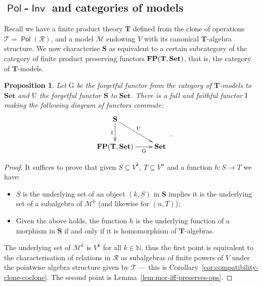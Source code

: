 \documentclass[11pt, a4paper, twoside,leqno]{amsart}
\newcommand{\cat}[1]{\mathbf{#1}}
\newcommand{\cd}[2][]{\vcenter{\hbox{\xymatrix#1{#2}}}}
\numberwithin{equation}{section}
\theoremstyle{plain}
\newtheorem{Prop}[Thm]{Proposition}
\theoremstyle{definition}
\newcommand{\Set}{\cat{Set}}
\DeclareMathOperator{\FP}{\bf FP}
\DeclareMathOperator{\Pol}{\mathsf{Pol}}
\DeclareMathOperator{\Inv}{\mathsf{Inv}}
\begin{document}
\subsection{\(\Pol\)-\(\Inv\) and categories of models}
\label{sec:syntactic-categories}

Recall we have a finite product theory \(\cat{T}\) defined from the clone of operations
\(\mathscr{T} =
\Pol(\mathscr{R})\), and a model \(\mathcal{M}\) endowing \(V\) with
its canonical \(\cat{T}\)-algebra structure. We now characterise \(\cat{S}\) as equivalent to a certain
subcategory of the 
category of finite
product preserving functors
\(\FP(\cat{T},\Set)\), that is, the category of \(\cat{T}\)-models.

\begin{Prop}
  \label{prop:forget-S-factorisation}
  Let \(\mathrm{G}\) be the forgetful functor from
  the category of \(\cat{T}\)-models to \(\cat{Set}\) and \(\mathrm{U}
  \) the forgetful functor \(\cat{S}\) to \(\Set\). There is a full and faithful functor \(\mathrm{I}\) making the following diagram of functors
  commute:
  \begin{equation}
    \label{eq:incl-S}
    \cd{
      {\cat{S}} \ar[d]_-{\mathrm{I}
      } \ar[dr]^-{\mathrm{U}
      } & \\
      {\FP(\cat{T},\Set)} \ar[r]_-{\mathrm{G}
      } & {\Set}
    }\rlap{ .}
  \end{equation}
\end{Prop}

\begin{proof}
  It suffices to prove that given \(S \subseteq V^{k}
  \), \(T \subseteq V^{n}
  \) and a function \(h \colon S \rightarrow
  T\) we have:
  \begin{itemize}
  \item \(S
    \) is the underlying set of an object \((k,S)\) in \(\cat{S}\)
    implies it is the underlying set of a subalgebra of
    \(\mathcal{M}^{k}\) (and likewise for \((n,T)\));
  \item Given the above holds, the function \(h\) is the underlying function of a
    morphism in \(\cat{S}\) if and only if it is homomorphism of
    \(\cat{T}\)-algebras. 
  \end{itemize}
  The underlying set of \(\mathcal{M}^{k}\) is \(V^{k}\) for all
  \(k\in \mathbb{N}
  \), thus the first point is equivalent to the characterisation of relations in
  \(\mathscr{R}\) as subalgebras of finite powers of \(V\) under the
  pointwise algebra structure given by \(\mathscr{T}
  \) --- this is
  Corollary~\ref{cor:compatibility-clone-coclone}. The second point is
  Lemma~\ref{lem:mor-iff-preserves-ops}. 
\end{proof}
\end{document}
